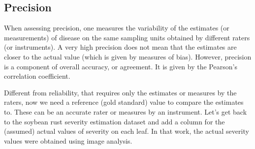 \documentclass[
  letterpaper,
  DIV=11,
  numbers=noendperiod]{scrreprt}
\begin{document}
\hypertarget{precision}{%
\subsection{Precision}\label{precision}}

When assessing precision, one measures the variability of the estimates
(or measurements) of disease on the same sampling units obtained by
different raters (or instruments). A very high precision does not mean
that the estimates are closer to the actual value (which is given by
measures of bias). However, precision is a component of overall
accuracy, or agreement. It is given by the Pearson's correlation
coefficient.

Different from reliability, that requires only the estimates or measures
by the raters, now we need a reference (gold standard) value to compare
the estimates to. These can be an accurate rater or measures by an
instrument. Let's get back to the soybean rust severity estimation
dataset and add a column for the (assumed) actual values of severity on
each leaf. In that work, the actual severity values were obtained using
image analysis.
\end{document}
